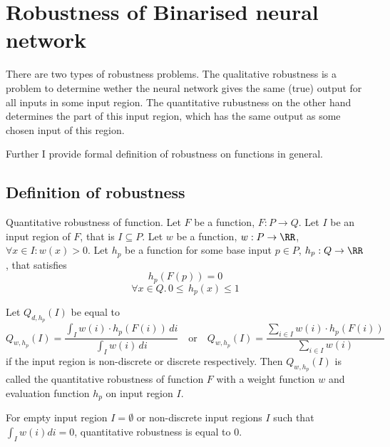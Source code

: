 \section{Robustness of Binarised neural network}

There are two types of robustness problems. The qualitative robustness
is a problem to determine wether the neural network gives the same (true)
output for all inputs in some input region. The quantitative rubustness
on the other hand determines the part of this input region, which has
the same output as some chosen input of this region.

Further I provide formal definition of robustness on functions in general.

\subsection{Definition of robustness}

\begin{definition}{Quantitative robustness of function.}\label{def:quantitative_robustness}
    Let $F$ be a function, $F: P \to Q$.
    Let $I$ be an input region of $F$, that is $I \subseteq P$.
    Let $w$ be a function, $w: P\to \RR$, $\forall x\in I: w(x) > 0$.
    Let $h_p$ be a function for some base input $p\in P$, $h_p: Q\to \RR$, that satisfies
    \begin{equation*}
        h_p(F(p)) = 0
    \end{equation*}
    \begin{equation*}
        \forall x\in Q .\, 0 \leq \, h_p(x) \leq 1 
    \end{equation*}

    \noindent
    Let $Q_{d, h_p}(I)$ be equal to
    \begin{equation*}
        Q_{w, h_p}(I) = \frac{\int_I w(i)\cdot h_p(F(i)) \, di}{\int_I w(i) \, di}
        \hspace{1em} \text{or} \hspace{1em}
        Q_{w, h_p}(I) = \frac{\sum_{i\in I} w(i)\cdot h_p(F(i))}{\sum_{i\in I} w(i)}
    \end{equation*}
    if the input region is non-discrete or discrete respectively.
    Then $Q_{w, h_p}(I)$ is called the quantitative robustness of function $F$
    with a weight function $w$ and evaluation function $h_p$ on input region $I$.

    For empty input region $I = \emptyset$
    or non-discrete input regions $I$ such that $\int_I w(i) di = 0$,
    quantitative robustness is equal to $0$.
\end{definition}

